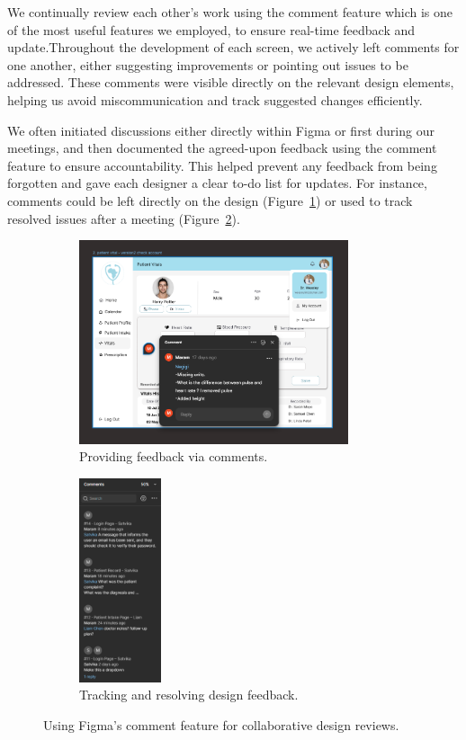 We continually review each other’s work using the comment feature which is one of the most useful features we employed, to ensure real-time feedback and update.Throughout the development of each screen, we actively left comments for one another, either suggesting improvements or pointing out issues to be addressed. These comments were visible directly on the relevant design elements, helping us avoid miscommunication and track suggested changes efficiently.

We often initiated discussions either directly within Figma or first during our meetings, and then documented the agreed-upon feedback using the comment feature to ensure accountability. This helped prevent any feedback from being forgotten and gave each designer a clear to-do list for updates. For instance, comments could be left directly on the design (Figure~\ref{fig:figma-comments-example-direct}) or used to track resolved issues after a meeting (Figure~\ref{fig:figma-comments-example-direct-afmeetings}).
\begin{figure}[htbp]
  \centering
  \captionsetup[subfigure]{labelformat=simple, labelsep=space, justification=centering}
  \renewcommand{\thesubfigure}{(\alph{subfigure})}
  \begin{subfigure}[t]{0.48\linewidth}
    \centering
    \includegraphics[height=6cm]{images03/3-2-2-figure2.png}
    \caption{Providing feedback via comments.}
    \label{fig:figma-comments-example-direct}
  \end{subfigure}\hfill
  \begin{subfigure}[t]{0.48\linewidth}
    \centering
    \includegraphics[height=6cm]{images03/3-2-2-figure3.png}
    \caption{Tracking and resolving design feedback.}
    \label{fig:figma-comments-example-direct-afmeetings}
  \end{subfigure}
  \caption{Using Figma's comment feature for collaborative design reviews.}
  \label{fig:figma-collaboration-comments}
\end{figure}

